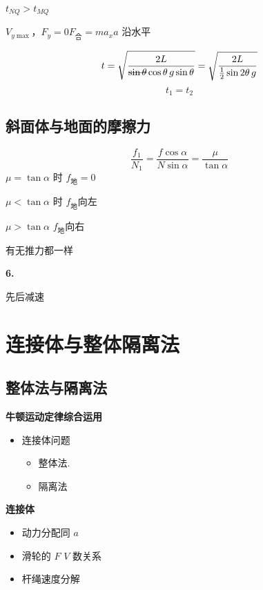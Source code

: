 $t_{NQ}>t_{MQ}$

$V_{y\max}$，$F_y=0$\quad $F_{\text{合}}=ma_x$\quad $a$ 沿水平


\[ t=\sqrt{\frac{2L}{\text{\struck{$\sin\theta$}}\cos\theta\, g\sin\theta}}=\sqrt{\frac{2L}{\frac12\sin2\theta\, g}} \]
\[ t_1=t_2 \]

\subsection{斜面体与地面的摩擦力}
\[ \frac{f_1}{N_1}=\frac{f\cos\alpha}{N\sin\alpha}=\frac{\mu}{\tan\alpha} \]
$\mu=\tan\alpha$ 时 $f_{\text{地}}=0$\par
$\mu<\tan\alpha$ 时 $f_{\text{地}}$向左\par
$\mu>\tan\alpha$ \quad $f_{\text{地}}$向右\par
有无推力都一样

\textbf{6.}

先后减速


\section{连接体与整体隔离法}
\subsection{整体法与隔离法}
\textbf{牛顿运动定律综合运用}
\begin{itemize}
\item 连接体问题
  \begin{itemize}
  \item 整体法.
  \item 隔离法
  \end{itemize}
\end{itemize}

\textbf{连接体}
\begin{itemize}
\item 动力分配\quad 同 $a$
\item 滑轮的 $F$ $V$ 数关系 %
\item 杆绳\quad 速度分解
\end{itemize}


